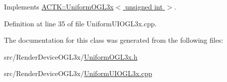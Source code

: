 Implements \hyperlink{class_a_c_t_k_1_1_uniform_o_g_l3x_ab94e9de72299648a82fc6867f203dcfa}{A\-C\-T\-K\-::\-Uniform\-O\-G\-L3x$<$ unsigned int $>$}.



Definition at line 35 of file Uniform\-U\-I\-O\-G\-L3x.\-cpp.



The documentation for this class was generated from the following files\-:\begin{DoxyCompactItemize}
\item 
src/\-Render\-Device\-O\-G\-L3x/\hyperlink{_uniform_o_g_l3x_8h}{Uniform\-O\-G\-L3x.\-h}\item 
src/\-Render\-Device\-O\-G\-L3x/\hyperlink{_uniform_u_i_o_g_l3x_8cpp}{Uniform\-U\-I\-O\-G\-L3x.\-cpp}\end{DoxyCompactItemize}

